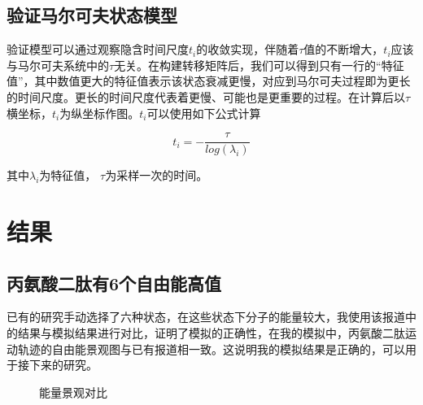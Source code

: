 \documentclass[a4paper]{article}
\begin{document}
\begin{CJK}{UTF8}{gbsn}
	\subsection{验证马尔可夫状态模型}

验证模型可以通过观察隐含时间尺度$t_{i}$的收敛实现，伴随着$\tau$值的不断增大，$t_{i}$应该与马尔可夫系统中的$\tau$无关。在构建转移矩阵后，我们可以得到只有一行的“特征值”，其中数值更大的特征值表示该状态衰减更慢，对应到马尔可夫过程即为更长的时间尺度。更长的时间尺度代表着更慢、可能也是更重要的过程。在计算后以$\tau$横坐标，$t_{i}$为纵坐标作图。$t_{i}$可以使用如下公式计算


\begin{equation}
t_{i} = -\frac{\tau}{log(\lambda_{i})}
\end{equation}

其中$\lambda_{i}$为特征值， $\tau$为采样一次的时间。





\section{结果}
	\subsection{丙氨酸二肽有6个自由能高值}
		已有的研究手动选择了六种状态，在这些状态下分子的能量较大，我使用该报道中的结果与模拟结果进行对比，证明了模拟的正确性，在我的模拟中，丙氨酸二肽运动轨迹的自由能景观图与已有报道相一致。这说明我的模拟结果是正确的，可以用于接下来的研究。

\begin{figure}[H]
\centering  
{}
\caption{能量景观对比}
\label{Fig.main}
\end{figure}





\end{CJK}
\end{document}
